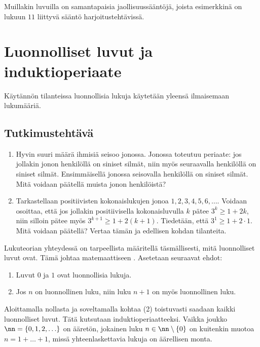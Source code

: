 Muillakin luvuilla on samantapaisia jaollisuussääntöjä, joista esimerkkinä on lukuun $11$ liittyvä sääntö harjoitustehtävissä.


\section{Luonnolliset luvut ja induktioperiaate} %

\medskip

Käytännön tilanteissa luonnollisia lukuja käytetään yleensä ilmaisemaan lukumääriä. 

\subsection*{Tutkimustehtävä}
\begin{enumerate}
\item
Hyvin suuri määrä ihmisiä seisoo jonossa. Jonossa toteutuu periaate: jos jollakin jonon
henkilöllä on siniset silmät, niin myös seuraavalla henkilöllä on siniset silmät. Ensimmäisellä jonossa seisovalla henkilöllä on siniset silmät. Mitä voidaan päätellä muista jonon henkilöistä?
\item
Tarkastellaan positiivisten kokonaislukujen jonoa $1, 2, 3, 4, 5, 6,\ldots$. Voidaan osoittaa, että jos jollakin positiivisella kokonaisluvulla $k$ pätee $3^k \ge 1+2k$, niin silloin pätee myös $3^{k+1} \ge 1+2(k+1)$. Tiedetään, että $3^1 \ge 1 + 2 \cdot 1$. Mitä voidaan päätellä? Vertaa tämän ja edellisen kohdan tilanteita.
\end{enumerate}

Lukuteorian yhteydessä on tarpeellista määritellä täsmällisesti, mitä luonnolliset luvut ovat. Tämä johtaa matemaattiseen . Asetetaan seuraavat ehdot:
\begin{enumerate}
\item Luvut $0$ ja $1$ ovat luonnollisia lukuja.
\item Jos $n$ on luonnollinen luku, niin luku $n+1$ on myös luonnollinen luku.
\end{enumerate}
Aloittamalla nollasta ja soveltamalla kohtaa (2) toistuvasti saadaan kaikki luonnolliset luvut. Tätä kutsutaan induktioperiaatteeksi. Vaikka joukko
$\nn = \{0, 1, 2, \ldots\}$
on ääretön, jokainen luku $n\in \nn\setminus \{0\}$ on kuitenkin muotoa $n=1+\ldots + 1$, missä yhteenlaskettavia lukuja on äärellisen monta.

